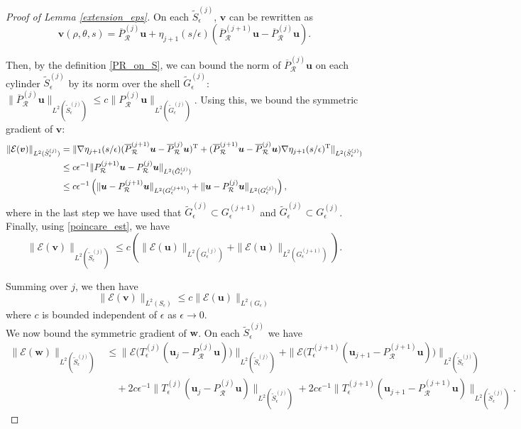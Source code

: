 \documentclass[11pt]{article}
\numberwithin{equation}{section}
\newcommand{\E}{\mathcal{E}}
\newcommand{\sR}{\mathcal{R}}
\newcommand{\bu}{\bm{u}}
\newcommand{\bw}{\bm{w}}
\newcommand{\bv}{\bm{v}}
\theoremstyle{definition}
\begin{document}
\begin{proof}[Proof of Lemma \ref{extension_eps}]
On each $\tilde S_{\epsilon}^{(j)}$, $\bv$ can be rewritten as
\[ \bv(\rho,\theta,s) = \overline P_{\sR}^{(j)}\bu +\eta_{j+1}(s/\epsilon) (\overline P_{\sR}^{(j+1)}\bu - \overline P_{\sR}^{(j)}\bu). \]

Then, by the definition \eqref{PR_on_S}, we can bound the norm of $\overline P_{\sR}^{(j)}\bu$ on each cylinder $\tilde S_{\epsilon}^{(j)}$ by its norm over the shell $\tilde G_{\epsilon}^{(j)}$: $\|\overline P_{\sR}^{(j)}\bu\|_{L^2(\tilde S_{\epsilon}^{(j)})} \le c\|P_{\sR}^{(j)}\bu\|_{L^2(\tilde G_{\epsilon}^{(j)})}$. Using this, we bound the symmetric gradient of $\bv$: 
\begin{align*}
\|\E(\bv)\|_{L^2(\tilde S_{\epsilon}^{(j)})} &= \|\nabla \eta_{j+1}(s/\epsilon)(\overline P_{\sR}^{(j+1)}\bu - \overline P_{\sR}^{(j)}\bu)^{\rm T} +  (\overline P_{\sR}^{(j+1)}\bu - \overline P_{\sR}^{(j)}\bu)\nabla \eta_{j+1}(s/\epsilon)^{\rm T} \|_{L^2(\tilde S_{\epsilon}^{(j)})} \\
&\le c\epsilon^{-1}\|P_{\sR}^{(j+1)}\bu - P_{\sR}^{(j)}\bu \|_{L^2(\tilde G_{\epsilon}^{(j)})} \\
&\le c\epsilon^{-1}\left(\|\bu-P_{\sR}^{(j+1)}\bu\|_{L^2(G_{\epsilon}^{(j+1)})}+\|\bu-P_{\sR}^{(j)}\bu\|_{L^2(G_{\epsilon}^{(j)})} \right),
\end{align*}
 where in the last step we have used that $\tilde G_{\epsilon}^{(j)} \subset G_{\epsilon}^{(j+1)}$ and $\tilde G_{\epsilon}^{(j)} \subset G_{\epsilon}^{(j)}$. Finally, using \eqref{poincare_est}, we have
\[\|\E( \bv)\|_{L^2(\tilde S_{\epsilon}^{(j)})} \le c\left(\|\E(\bu)\|_{L^2(G_{\epsilon}^{(j)})}+\|\E(\bu)\|_{L^2(G_{\epsilon}^{(j+1)})}\right).\]

Summing over $j$, we then have
\[ \|\E(\bv)\|_{L^2(S_{\epsilon})} \le c \|\E(\bu)\|_{L^2(G_{\epsilon})} \]
where $c$ is bounded independent of $\epsilon$ as $\epsilon\to 0$. \\

We now bound the symmetric gradient of $\bw$. On each $\tilde S_{\epsilon}^{(j)}$ we have
\begin{align*}
 \|\E(\bw)\|_{L^2(\tilde S_{\epsilon}^{(j)})} &\le  \|\E\big(T_{\epsilon}^{(j)}(\bu_j -P_{\sR}^{(j)}\bu)\big) \|_{L^2(\tilde S_{\epsilon}^{(j)})}+  \|\E\big(T_{\epsilon}^{(j+1)}(\bu_{j+1} -P_{\sR}^{(j+1)}\bu)\big) \|_{L^2(\tilde S_{\epsilon}^{(j)})} \\
 &\quad + 2c\epsilon^{-1} \|T_{\epsilon}^{(j)}(\bu_j-P_{\sR}^{(j)}\bu)\|_{L^2(\tilde S_{\epsilon}^{(j)})} + 2c\epsilon^{-1} \|T_{\epsilon}^{(j+1)}(\bu_{j+1}-P_{\sR}^{(j+1)}\bu)\|_{L^2(\tilde S_{\epsilon}^{(j)})}. 
 \end{align*}


\end{proof}
\end{document}
